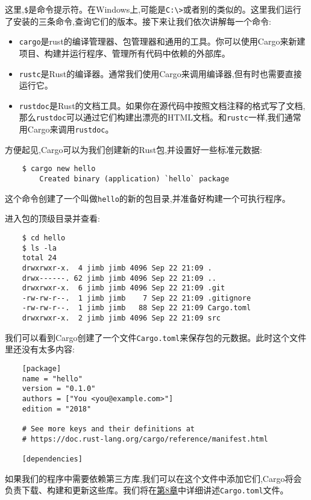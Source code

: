 这里,\texttt{\$}是命令提示符。在Windows上,可能是\texttt{C:\textbackslash>}或者别的类似的。这里我们运行了安装的三条命令,查询它们的版本。接下来让我们依次讲解每一个命令:
\begin{itemize}
    \item \texttt{cargo}是rust的编译管理器、包管理器和通用的工具。你可以使用Cargo来新建项目、构建并运行程序、管理所有代码中依赖的外部库。
    \item \texttt{rustc}是Rust的编译器。通常我们使用Cargo来调用编译器,但有时也需要直接运行它。
    \item \texttt{rustdoc}是Rust的文档工具。如果你在源代码中按照文档注释的格式写了文档,那么\texttt{rustdoc}可以通过它们构建出漂亮的HTML文档。和\texttt{rustc}一样,我们通常用Cargo来调用\texttt{rustdoc}。
\end{itemize}

方便起见,Cargo可以为我们创建新的Rust包,并设置好一些标准元数据:
\begin{verbatim}
    $ cargo new hello
        Created binary (application) `hello` package
\end{verbatim}

这个命令创建了一个叫做\texttt{hello}的新的包目录,并准备好构建一个可执行程序。

进入包的顶级目录并查看:
\begin{verbatim}
    $ cd hello
    $ ls -la
    total 24
    drwxrwxr-x.  4 jimb jimb 4096 Sep 22 21:09 .
    drwx------. 62 jimb jimb 4096 Sep 22 21:09 ..
    drwxrwxr-x.  6 jimb jimb 4096 Sep 22 21:09 .git
    -rw-rw-r--.  1 jimb jimb    7 Sep 22 21:09 .gitignore
    -rw-rw-r--.  1 jimb jimb   88 Sep 22 21:09 Cargo.toml
    drwxrwxr-x.  2 jimb jimb 4096 Sep 22 21:09 src
\end{verbatim}

我们可以看到Cargo创建了一个文件\texttt{Cargo.toml}来保存包的元数据。此时这个文件里还没有太多内容:
\begin{verbatim}
    [package]
    name = "hello"
    version = "0.1.0"
    authors = ["You <you@example.com>"]
    edition = "2018"

    # See more keys and their definitions at
    # https://doc.rust-lang.org/cargo/reference/manifest.html

    [dependencies]
\end{verbatim}

如果我们的程序中需要依赖第三方库,我们可以在这个文件中添加它们,Cargo将会负责下载、构建和更新这些库。我们将在\hyperref[ch08]{第8章}中详细讲述\texttt{Cargo.toml}文件。

